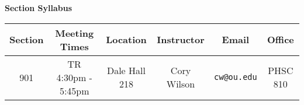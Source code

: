 \documentclass[notes]{subfiles}
\begin{document}
\rhead{}
\lhead{}
\chead{}
\thispagestyle{empty}

	\begin{center}
		\textbf{\Large{Section Syllabus}}
	\end{center}
		\vspace{.45in}
		
\begin{center}
	\begin{tabular}{|c|c|c|c|c|c|} \hline
		\textbf{Section} 	& \textbf{Meeting Times} 	& \textbf{Location}	 & \textbf{Instructor} & \textbf{Email} 					& \textbf{Office} \\ \hline
		901 				& TR 4:30pm - 5:45pm 		& Dale Hall 218 & Cory Wilson 		& \texttt{cw@ou.edu}	 	& PHSC 810 \\ \hline
	\end{tabular}
\end{center}
\end{document}
